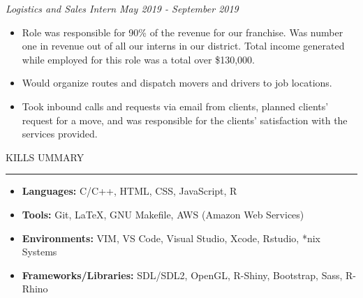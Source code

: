 \documentclass[11pt]{article}
\begin{document}
\textbf{\scalebox{1.2}{Two Men and a Truck}} \hfill \scalebox{1.1}{Ann Arbor, Michigan}
\par \textit{Logistics and Sales Intern} \hfill \textit{May 2019 - September 2019}
{\small
\begin{itemize}
    \item Role was responsible for 90\% of the revenue for our franchise. Was number one in revenue out of all our interns in our district. Total income generated while employed for this role was a total over \$130,000. 
    \item Would organize routes and dispatch movers and drivers to job locations.
    \item Took inbound calls and requests via email from clients, planned clients' request for a move, and was responsible for the clients' satisfaction with the services provided. 
\end{itemize}
}
\par \scalebox{1.3}{S}KILLS \scalebox{1.3}{S}UMMARY                  
\par \vspace{-0.1in} \noindent\rule{7.8in}{0.5pt} 

\begin{itemize}
    \item \textbf{Languages:} \hspace*{3cm} C/C++, HTML, CSS, JavaScript, R
    \item \textbf{Tools:} \hspace*{4cm} Git, \LaTeX, GNU Makefile, AWS (Amazon Web Services)
    \item \textbf{Environments:} \hspace*{2.35cm} VIM, VS Code, Visual Studio, Xcode, Rstudio, *nix Systems
    \item \textbf{Frameworks/Libraries:} \hspace*{0.9cm}SDL/SDL2, OpenGL, R-Shiny, Bootstrap, Sass, R-Rhino
\end{itemize}
\end{document}
